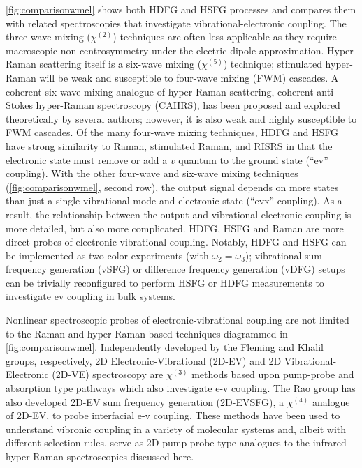 \documentclass[aip, jcp, reprint, onecolumn, nofootinbib]{revtex4-2}
\begin{document}
\autoref{fig:comparisonwmel} shows both HDFG and HSFG processes and compares them with related spectroscopies that investigate vibrational-electronic coupling.
The three-wave mixing ($\chi^{(2)}$) techniques are often less applicable as they require macroscopic non-centrosymmetry under the electric dipole approximation.\cite{RN480}
Hyper-Raman scattering itself is a six-wave mixing ($\chi^{(5)}$) technique; stimulated hyper-Raman will be weak and susceptible to four-wave mixing (FWM) cascades.\cite{RN515, RN243, Cho2000_Cascade}
A coherent six-wave mixing analogue of hyper-Raman scattering, coherent anti-Stokes hyper-Raman spectroscopy (CAHRS), has been proposed and explored theoretically by several authors; however, it is also weak and highly susceptible to FWM cascades.\cite{Taran1977, Berger1978, Bjarnason1980, Cho1997, Cho1998}
Of the many four-wave mixing techniques, HDFG and HSFG have strong similarity to Raman, stimulated Raman, and RISRS in that the electronic state must remove or add a $v$ quantum to the ground state (``ev'' coupling).
With the other four-wave and six-wave mixing techniques (\autoref{fig:comparisonwmel}, second row), the output signal depends on more states than just a single vibrational mode and electronic state (``evx'' coupling).\cite{RN445, RN335} 
As a result, the relationship between the output and vibrational-electronic coupling is more detailed, but also more complicated.
HDFG, HSFG and Raman are more direct probes of electronic-vibrational coupling.
Notably, HDFG and HSFG can be implemented as two-color experiments (with $\omega_2=\omega_3$);\cite{Cho2001} vibrational sum frequency generation (vSFG) or difference frequency generation (vDFG) setups can be trivially reconfigured to perform HSFG or HDFG measurements to investigate ev coupling in bulk systems.

Nonlinear spectroscopic probes of electronic-vibrational coupling are not limited to the Raman and hyper-Raman based techniques diagrammed in \autoref{fig:comparisonwmel}.
Independently developed by the Fleming and Khalil groups, respectively, 2D Electronic-Vibrational (2D-EV) and 2D Vibrational-Electronic (2D-VE) spectroscopy are $\chi^{(3)}$ methods based upon pump-probe and absorption type pathways which also investigate e-v coupling.\cite{Oliver2014, Courtney2015, Courtney2015_1}
The Rao group has also developed 2D-EV sum frequency generation (2D-EVSFG), a $\chi^{(4)}$ analogue of 2D-EV, to probe interfacial e-v coupling. \cite{Deng2021}  
These methods have been used to understand vibronic coupling in a variety of molecular systems and, albeit with different selection rules, serve as 2D pump-probe type analogues to the infrared-hyper-Raman spectroscopies discussed here.
\end{document}
